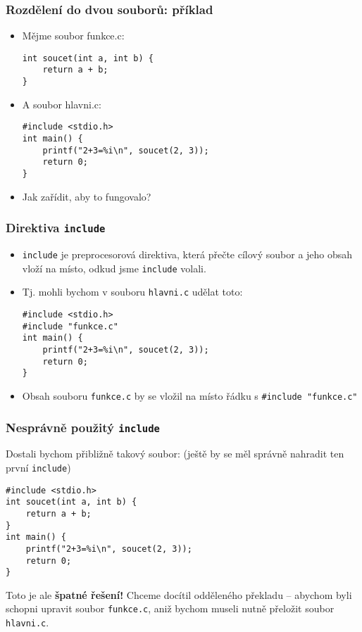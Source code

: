 \documentclass{beamer}
\newenvironment{itemizex}%
  {\large \begin{itemize}%
    \setlength{\itemsep}{8pt}%
    \setlength{\parskip}{8pt}}%
  {\end{itemize}}
\newenvironment{itemizey}%
  {\large \begin{itemize}%
    \setlength{\itemsep}{6pt}%
    \setlength{\parskip}{6pt}}%
  {\end{itemize}}
\begin{document}
\begin{frame}[t,fragile]\frametitle{Rozdělení do dvou souborů: příklad} 
\begin{itemizey}
    \item Mějme soubor funkce.c:
\begin{verbatim} 
int soucet(int a, int b) {
    return a + b;
}
\end{verbatim}
    \item A soubor hlavni.c:
\begin{verbatim} 
#include <stdio.h>
int main() {
    printf("2+3=%i\n", soucet(2, 3));
    return 0;
}
\end{verbatim}
    \item Jak zařídit, aby to fungovalo?
\end{itemizey}
\end{frame}


\begin{frame}[t,fragile]\frametitle{Direktiva \texttt{include}} 
    \begin{itemizex}
        \item \texttt{include} je preprocesorová direktiva, která přečte cílový soubor a jeho obsah vloží na místo, odkud jsme \texttt{include} volali.
        \item Tj. mohli bychom v souboru \texttt{hlavni.c} udělat toto:
\begin{verbatim} 
#include <stdio.h>
#include "funkce.c"
int main() {
    printf("2+3=%i\n", soucet(2, 3));
    return 0;
}
\end{verbatim}
        \item Obsah souboru \texttt{funkce.c} by se vložil na místo řádku s \texttt{\#include "funkce.c"}
    \end{itemizex}
\end{frame}


\begin{frame}[t,fragile]\frametitle{Nesprávně použitý \texttt{include}} 
Dostali bychom přibližně takový soubor: (ještě by se měl správně nahradit ten první \texttt{include})
\begin{verbatim} 
#include <stdio.h>
int soucet(int a, int b) {
    return a + b;
}
int main() {
    printf("2+3=%i\n", soucet(2, 3));
    return 0;
}
\end{verbatim}
Toto je ale \textbf{špatné řešení!} Chceme docítil odděleného překladu -- abychom byli schopni upravit soubor \texttt{funkce.c}, aniž bychom museli nutně přeložit soubor \texttt{hlavni.c}.
\end{frame}
\end{document}
